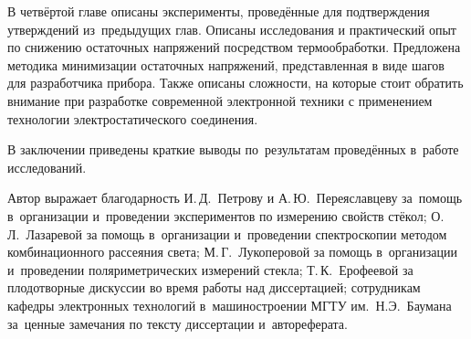 В четвёртой главе описаны эксперименты,
проведённые для подтверждения утверждений из~предыдущих глав. Описаны
исследования и практический опыт по снижению остаточных напряжений
посредством термообработки. Предложена методика минимизации остаточных
напряжений, представленная в виде шагов для разработчика прибора.
Также описаны сложности, на которые стоит обратить внимание при
разработке современной электронной техники с применением технологии
электростатического соединения.

В заключении приведены краткие выводы
по~результатам проведённых в~работе исследований.

\begingroup
Автор выражает благодарность И.\,Д.~Петрову и А.\,Ю.~Переяславцеву за~помощь в~организации и~проведении экспериментов по измерению свойств стёкол;
О.\,Л.~Лазаревой за помощь в~организации и~проведении спектроскопии методом комбинационного рассеяния света; М.\,Г.~Лукоперовой за помощь в~организации и~проведении поляриметрических измерений стекла;
Т.\,К.~Ерофеевой
за плодотворные дискуссии во время работы над диссертацией;
сотрудникам кафедры электронных технологий в~машиностроении \mbox{МГТУ} им.~Н.Э.~Баумана
за~ценные замечания по тексту диссертации и~автореферата.\russianpar
\endgroup
%